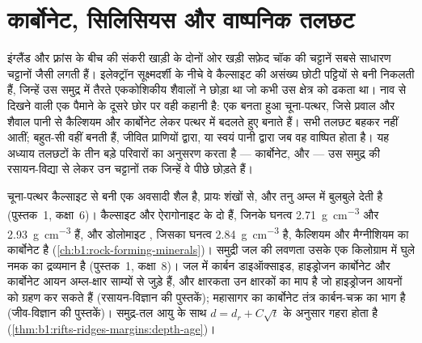 \chapter{कार्बोनेट, सिलिसियस और वाष्पनिक तलछट}\label{ch:b1:chemical-biogenic-sediments}

इंग्लैंड और फ़्रांस के बीच की संकरी खाड़ी के दोनों ओर खड़ी सफ़ेद चॉक की चट्टानें सबसे साधारण चट्टानों जैसी लगती हैं। इलेक्ट्रॉन सूक्ष्मदर्शी के नीचे वे कैल्साइट की असंख्य छोटी पट्टियों से बनी निकलती हैं, जिन्हें उस समुद्र में तैरते एककोशिकीय शैवालों ने छोड़ा था जो कभी उस क्षेत्र को ढकता था। नाव से दिखने वाली एक  पैमाने के दूसरे छोर पर वही कहानी है: एक बनता हुआ चूना-पत्थर, जिसे प्रवाल और शैवाल पानी से कैल्शियम और कार्बोनेट लेकर पत्थर में बदलते हुए बनाते हैं। सभी तलछट बहकर नहीं आतीं; बहुत-सी वहीं बनती हैं, जीवित प्राणियों द्वारा, या स्वयं पानी द्वारा जब वह वाष्पित होता है। यह अध्याय तलछटों के तीन बड़े परिवारों का अनुसरण करता है --- कार्बोनेट,  और  --- उस समुद्र की रसायन-विद्या से लेकर उन चट्टानों तक जिन्हें वे पीछे छोड़ते हैं।

\begin{recall}
चूना-पत्थर कैल्साइट से बनी एक अवसादी शैल है, प्रायः शंखों से, और तनु अम्ल में बुलबुले देती है (पुस्तक~1, कक्षा~6)। कैल्साइट और ऐरागोनाइट  के दो  हैं, जिनके घनत्व \qty{2.71}{g.cm^{-3}} और \qty{2.93}{g.cm^{-3}} हैं, और डोलोमाइट , जिसका घनत्व \qty{2.84}{g.cm^{-3}} है, कैल्शियम और मैग्नीशियम का कार्बोनेट है (\cref{ch:b1:rock-forming-minerals})। समुद्री जल की लवणता उसके एक किलोग्राम में घुले नमक का द्रव्यमान है (पुस्तक~1, कक्षा~8)। जल में कार्बन डाइऑक्साइड, हाइड्रोजन कार्बोनेट और कार्बोनेट आयन अम्ल-क्षार साम्यों से जुड़े हैं, और क्षारकता उन क्षारकों का माप है जो हाइड्रोजन आयनों को ग्रहण कर सकते हैं (रसायन-विज्ञान की पुस्तकें); महासागर का कार्बोनेट तंत्र कार्बन-चक्र का भाग है (जीव-विज्ञान की पुस्तकें)। समुद्र-तल आयु के साथ $d = d_r + C\sqrt t$ के अनुसार गहरा होता है (\cref{thm:b1:rifts-ridges-margins:depth-age})।
\end{recall}

